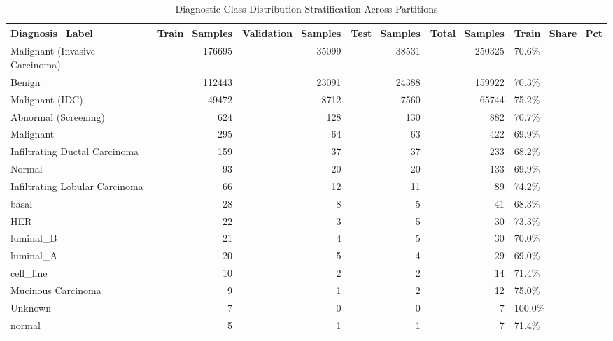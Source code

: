 \begin{table}
\caption{Diagnostic Class Distribution Stratification Across Partitions}
\label{tab:table_class_distribution}
\begin{tabular}{lrrrrl}
\toprule
Diagnosis\_Label & Train\_Samples & Validation\_Samples & Test\_Samples & Total\_Samples & Train\_Share\_Pct \\
\midrule
Malignant (Invasive Carcinoma) & 176695 & 35099 & 38531 & 250325 & 70.6\% \\
Benign & 112443 & 23091 & 24388 & 159922 & 70.3\% \\
Malignant (IDC) & 49472 & 8712 & 7560 & 65744 & 75.2\% \\
Abnormal (Screening) & 624 & 128 & 130 & 882 & 70.7\% \\
Malignant & 295 & 64 & 63 & 422 & 69.9\% \\
Infiltrating Ductal Carcinoma & 159 & 37 & 37 & 233 & 68.2\% \\
Normal & 93 & 20 & 20 & 133 & 69.9\% \\
Infiltrating Lobular Carcinoma & 66 & 12 & 11 & 89 & 74.2\% \\
basal & 28 & 8 & 5 & 41 & 68.3\% \\
HER & 22 & 3 & 5 & 30 & 73.3\% \\
luminal\_B & 21 & 4 & 5 & 30 & 70.0\% \\
luminal\_A & 20 & 5 & 4 & 29 & 69.0\% \\
cell\_line & 10 & 2 & 2 & 14 & 71.4\% \\
Mucinous Carcinoma & 9 & 1 & 2 & 12 & 75.0\% \\
Unknown & 7 & 0 & 0 & 7 & 100.0\% \\
normal & 5 & 1 & 1 & 7 & 71.4\% \\
\bottomrule
\end{tabular}
\end{table}
